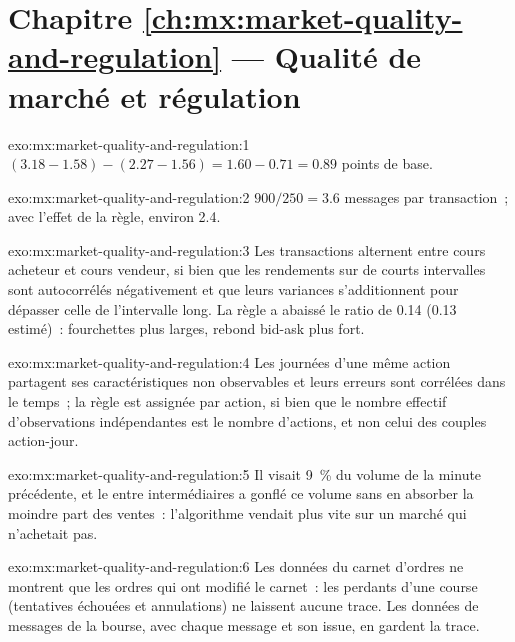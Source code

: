 \section*{Chapitre \ref{ch:mx:market-quality-and-regulation} --- Qualité de marché et régulation}

\begin{solution}{exo:mx:market-quality-and-regulation:1}
$(3.18-1.58)-(2.27-1.56)=1.60-0.71=0.89$ points de base.
\end{solution}

\begin{solution}{exo:mx:market-quality-and-regulation:2}
$900/250=3.6$ messages par transaction~; avec l'effet de la règle, environ 2.4.
\end{solution}

\begin{solution}{exo:mx:market-quality-and-regulation:3}
Les transactions alternent entre cours acheteur et cours vendeur, si bien que les rendements sur de courts intervalles sont autocorrélés négativement et que leurs variances s'additionnent pour dépasser celle de l'intervalle long.
La règle a abaissé le ratio de 0.14 (0.13 estimé)~: fourchettes plus larges, rebond bid-ask plus fort.
\end{solution}

\begin{solution}{exo:mx:market-quality-and-regulation:4}
Les journées d'une même action partagent ses caractéristiques non observables et leurs erreurs sont corrélées dans le temps~; la règle est assignée par action, si bien que le nombre effectif
d'observations indépendantes est le nombre d'actions, et non celui des couples action-jour.
\end{solution}

\begin{solution}{exo:mx:market-quality-and-regulation:5}
Il visait 9~\% du volume de la minute précédente, et le  entre intermédiaires a gonflé ce volume sans en absorber la moindre part des ventes~:
l'algorithme vendait plus vite sur un marché qui n'achetait pas.
\end{solution}

\begin{solution}{exo:mx:market-quality-and-regulation:6}
Les données du carnet d'ordres ne montrent que les ordres qui ont modifié le carnet~: les perdants d'une course (tentatives échouées et annulations) ne laissent aucune trace. Les données de messages de la bourse,
avec chaque message et son issue, en gardent la trace.
\end{solution}

